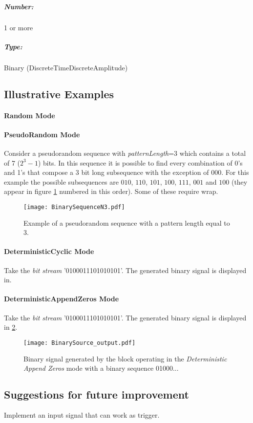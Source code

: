 \subparagraph*{Number:} 1 or more

\subparagraph*{Type:} Binary (DiscreteTimeDiscreteAmplitude)

\subsection*{Illustrative Examples}

\paragraph*{Random Mode}

\paragraph*{PseudoRandom Mode}
Consider a pseudorandom sequence with \textit{patternLength}=3 which contains a total of 7 ($2^3-1$) bits. In this sequence it is possible to find every combination of 0's and 1's that compose a 3 bit long subsequence with the exception of $000$. For this example the possible subsequences are $010$, $110$, $101$, $100$, $111$, $001$ and $100$ (they appear in figure \ref{BinarySequenceN3} numbered in this order). Some of these require wrap.

\begin{figure}[h]
	\centering
\texttt{[image: BinarySequenceN3.pdf]}
\caption{Example of a pseudorandom sequence with a pattern length equal to 3.}\label{BinarySequenceN3}
\end{figure}

\paragraph*{DeterministicCyclic Mode}

Take the \textit{bit stream} '0100011101010101'. The generated binary signal is displayed in.

\paragraph*{DeterministicAppendZeros Mode}

Take the \textit{bit stream} '0100011101010101'. The generated binary signal is displayed in \ref{MQAM1_DeterministAppendZeros}.

\begin{figure}
	\centering
	\texttt{[image: BinarySource\_output.pdf]}
	
	\caption{Binary signal generated by the block operating in the \textit{Deterministic Append Zeros} mode with a binary sequence 01000...}\label{MQAM1_DeterministAppendZeros}
\end{figure}

\subsection*{Suggestions for future improvement}

Implement an input signal that can work as trigger.

